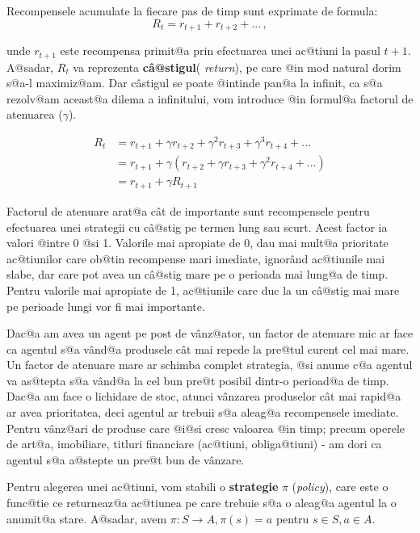 Recompensele acumulate la fiecare pas de timp sunt exprimate de formula: 
\begin{equation}
	R_t = r_{t+1} + r_{t+2} + ... \,,
\end{equation}


\noindent unde $r_{t+1}$ este recompensa primit@a prin efectuarea unei ac@tiuni la pasul $t+1$. A@sadar, $R_t$ va reprezenta \textbf{c\^ a@stigul}( \textsl{return}), pe care @in mod natural dorim s@a-l maximiz@am. Dar c\^ astigul se poate @intinde pan@a la infinit, ca s@a rezolv@am aceast@a dilema a infinitului, vom introduce @in formul@a factorul de atenuarea ($\gamma$).


\begin{align}
	R_t & =  r_{t+1} + \gamma r_{t+2} + \gamma^{2} r_{t+3} + \gamma^{3} r_{t+4} + ... \nonumber \\
	& =  r_{t+1} + \gamma \left( r_{t+2} + \gamma r_{t+3} + \gamma^{2} r_{t+4} + ...  \right) \nonumber \\
	& =  r_{t+1} + \gamma R_{t+1}
\end{align}

Factorul de atenuare arat@a c\^ at de importante sunt recompensele pentru efectuarea unei strategii cu c\^ a@stig pe termen lung sau scurt. Acest factor ia valori @intre 0 @si 1. Valorile mai apropiate de 0, dau mai mult@a prioritate ac@tiunilor care ob@tin recompense mari imediate, ignor\^ and ac@tiunile mai slabe, dar care pot avea un c\^ a@stig mare pe o perioada mai lung@a de timp. Pentru valorile mai apropiate de 1, ac@tiunile care duc la un c\^ a@stig mai mare pe perioade lungi vor fi mai importante.

Dac@a am avea un agent pe post de v\^ anz@ator, un factor de atenuare mic ar face ca agentul s@a v\^ and@a produsele c\^ at mai repede la pre@tul curent cel mai mare. Un factor de atenuare mare ar schimba complet strategia, @si anume c@a agentul va as@tepta s@a v\^ and@a la cel bun pre@t posibil dintr-o perioad@a de timp. Dac@a am face o lichidare de stoc, atunci v\^ anzarea produselor c\^ at mai rapid@a ar avea prioritatea, deci agentul ar trebuii s@a aleag@a recompensele imediate. Pentru v\^ anz@ari de produse care @i@si cresc valoarea @in timp; precum operele de art@a, imobiliare, titluri financiare (ac@tiuni, obliga@tiuni) - am dori ca agentul s@a a@stepte un pre@t bun de v\^ anzare.

Pentru alegerea unei ac@tiuni, vom stabili o \textbf{strategie} $\pi$ (\textsl{policy}), care este o func@tie ce returneaz@a ac@tiunea pe care trebuie s@a o aleag@a agentul la o anumit@a stare. A@sadar, avem $\pi: S \rightarrow A, \pi(s) = a $ pentru $ s \in S, a \in A$.

